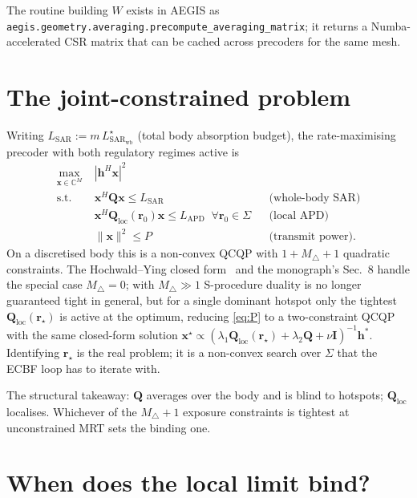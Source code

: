 \documentclass[journal]{IEEEtran}
\newcommand{\rr}{\bm{r}}
\newcommand{\xx}{\bm{x}}
\newcommand{\hh}{\bm{h}}
\newcommand{\SARwb}{\mathrm{SAR}_{\mathrm{wb}}}
\newcommand{\SAR}{\mathrm{SAR}}
\newcommand{\APD}{\mathrm{APD}}
\newcommand{\Q}{\mathbf{Q}}
\begin{document}
The routine building $W$ exists in AEGIS as
\texttt{aegis.geometry.averaging.\allowbreak precompute\_averaging\_matrix};
it returns a Numba-accelerated CSR matrix that can be cached across
precoders for the same mesh.

\section{The joint-constrained problem}\label{sec:jointP}

Writing $L_{\SAR}\!:=\!m\,L_{\SARwb}^\star$ (total body
absorption budget), the rate-maximising precoder with both regulatory
regimes active is
\begin{equation}\label{eq:P}
  \boxed{\;
  \begin{aligned}
    \max_{\xx\in\mathbb{C}^M}\;& |\hh^H\xx|^2 \\
    \text{s.t.}\;& \xx^H\Q\xx \le L_{\SAR} &&\text{(whole-body SAR)}\\
    & \xx^H\Q_{\mathrm{loc}}(\rr_0)\xx \le L_{\APD} \;\;\forall\rr_0\!\in\!\Sigma && \text{(local APD)} \\
    & \lVert\xx\rVert^2 \le P &&\text{(transmit power)}.
  \end{aligned}\;}
\end{equation}
On a discretised body this is a non-convex QCQP with
$1+M_\triangle+1$ quadratic constraints. The Hochwald--Ying closed
form~\cite{Hochwald2014,Ying2015} and the monograph's Sec.~8 handle
the special case $M_\triangle\!=\!0$; with $M_\triangle\!\gg\! 1$
S-procedure duality is no longer guaranteed tight in general, but
for a single dominant hotspot only the tightest
$\Q_{\mathrm{loc}}(\rr_\star)$ is active at the optimum, reducing
\eqref{eq:P} to a two-constraint QCQP with the same closed-form
solution $\xx^\star\!\propto\!(\lambda_1\Q_{\mathrm{loc}}(\rr_\star)+\lambda_2\Q+\nu\mathbf I)^{-1}\hh^*$.
Identifying $\rr_\star$ is the real problem; it is a non-convex search
over $\Sigma$ that the ECBF loop has to iterate with.

The structural takeaway: $\Q$ averages over the body and is blind to
hotspots; $\Q_{\mathrm{loc}}$ localises. Whichever of the
$M_\triangle\!+\!1$ exposure constraints is tightest at unconstrained
MRT sets the binding one.

\section{When does the local limit bind?}\label{sec:crossover}
\end{document}

